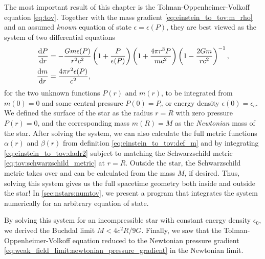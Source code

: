 The most important result of this chapter is the Tolman-Oppenheimer-Volkoff equation \eqref{eq:tov}.
Together with the mass gradient \eqref{eq:einstein_to_tov:m_rho} and an assumed \emph{known} equation of state $\epsilon = \epsilon(P)$, they are best viewed as the system of two differential equations
\begin{subequations}
\label{eq:tov:tovsys}
\begin{align}
	\odv{P}{r} &= -\frac{G m \epsilon(P)}{r^2 c^2} \left( 1 + \frac{P}{\epsilon(P)} \right) \left( 1 + \frac{4 \pi r^3 P}{m c^2} \right) \left( 1 - \frac{2 G m}{r c^2} \right)^{-1} , \label{eq:tov:tovsys_pressure} \\
	\odv{m}{r} &= \frac{4 \pi r^2 \epsilon(P)}{c^2} , \label{eq:tov:tovsys_mass}
\end{align}
\end{subequations}
for the two unknown functions $P(r)$ and $m(r)$, to be integrated from $m(0) = 0$ and some central pressure $P(0) = P_c$ or energy density $\epsilon(0) = \epsilon_c$.
We defined the surface of the star as the radius $r=R$ with zero pressure $P(r) = 0$, and the corresponding mass $m(R) = M$ as the \emph{Newtonian} mass of the star.
After solving the system, we can also calculate the full metric functions $\alpha(r)$ and $\beta(r)$ from definition \eqref{eq:einstein_to_tov:def_m} and by integrating \cref{eq:einstein_to_tov:dadr2} subject to matching the Schwarzschild metric \eqref{eq:tov:schwarzschild_metric} at $r=R$.
Outside the star, the Schwarzschild metric takes over and can be calculated from the mass $M$, if desired.
Thus, solving this system gives us the full spacetime geometry both inside and outside the star!
In \cref{sec:nstars:numtov}, we present a program that integrates the system numerically for an arbitrary equation of state.

By solving this system for an incompressible star with constant energy density $\epsilon_0$, we derived the Buchdal limit $M < 4 c^2 R / 9 G$.
Finally, we saw that the Tolman-Oppenheimer-Volkoff equation reduced to the Newtonian pressure gradient \eqref{eq:weak_field_limit:newtonian_pressure_gradient} in the Newtonian limit.
